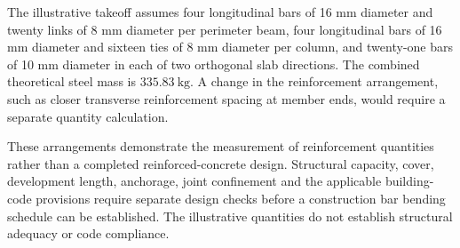 The illustrative takeoff assumes four longitudinal bars of 16 mm diameter and twenty links of 8 mm diameter per perimeter beam, four longitudinal bars of 16 mm diameter and sixteen ties of 8 mm diameter per column, and twenty-one bars of 10 mm diameter in each of two orthogonal slab directions. The combined theoretical steel mass is \(335.83~\mathrm{kg}\). A change in the reinforcement arrangement, such as closer transverse reinforcement spacing at member ends, would require a separate quantity calculation.

These arrangements demonstrate the measurement of reinforcement quantities rather than a completed reinforced-concrete design. Structural capacity, cover, development length, anchorage, joint confinement and the applicable building-code provisions require separate design checks before a construction bar bending schedule can be established. The illustrative quantities do not establish structural adequacy or code compliance.
